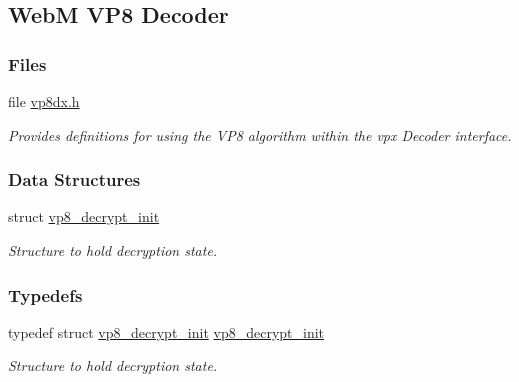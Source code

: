 \hypertarget{group__vp8__decoder}{\subsection{Web\+M V\+P8 Decoder}
\label{group__vp8__decoder}
}
\subsubsection*{Files}
\begin{DoxyCompactItemize}
\item 
file \hyperlink{vp8dx_8h}{vp8dx.\+h}
\begin{DoxyCompactList}\small\item\em Provides definitions for using the V\+P8 algorithm within the vpx Decoder interface. \end{DoxyCompactList}\end{DoxyCompactItemize}
\subsubsection*{Data Structures}
\begin{DoxyCompactItemize}
\item 
struct \hyperlink{structvp8__decrypt__init}{vp8\+\_\+decrypt\+\_\+init}
\begin{DoxyCompactList}\small\item\em Structure to hold decryption state. \end{DoxyCompactList}\end{DoxyCompactItemize}
\subsubsection*{Typedefs}
\begin{DoxyCompactItemize}
\item 
typedef struct \hyperlink{structvp8__decrypt__init}{vp8\+\_\+decrypt\+\_\+init} \hyperlink{group__vp8__decoder_ga718de6c94c9561b35aa7497f1182758b}{vp8\+\_\+decrypt\+\_\+init}
\begin{DoxyCompactList}\small\item\em Structure to hold decryption state. \end{DoxyCompactList}\end{DoxyCompactItemize}
